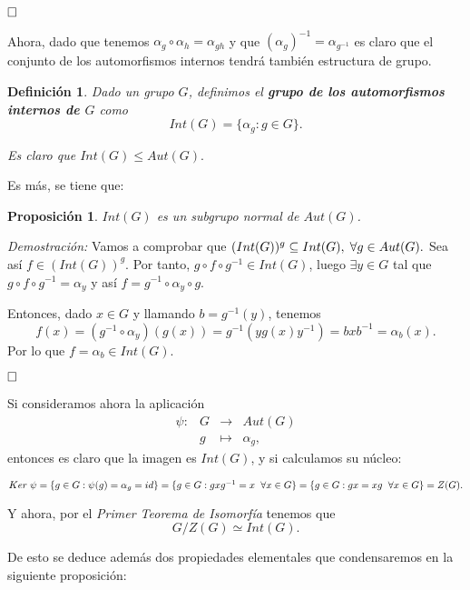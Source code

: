 \documentclass[12pt]{article}
\newtheorem{proposition}[theorem]{Proposición}
\newtheorem{definition}[theorem]{Definición}
\begin{document}
$\hfill \square$

Ahora, dado que tenemos $\alpha_{g} \circ \alpha_{h} = \alpha_{gh}$ y que $(\alpha_{g})^{-1} = \alpha_{g^{-1}}$ es claro que el conjunto de los automorfismos internos tendrá también estructura de grupo.

\begin{definition} Dado un grupo $G$, definimos el \textbf{grupo de los automorfismos internos de $G$} como 
$$Int (G) = \lbrace\alpha_{g} : g \in G \rbrace.$$

Es claro que $Int (G) \leq Aut(G).$
\end{definition}

Es más, se tiene que: 

\begin{proposition}$Int(G)$ es un subgrupo normal de $Aut(G)$.
\end{proposition}
\emph{Demostración: }Vamos a comprobar que $(Int (G))^{g} \subseteq Int(G), \hspace{0.1cm} \forall g \in Aut(G).$ Sea así $f \in (Int(G))^{g}$. Por tanto, $g \circ f \circ g^{-1} \in Int(G)$, luego $\exists y \in G$ tal que $g \circ f \circ g^{-1} = \alpha_{y}$ y así $f= g^{-1} \circ \alpha_{y} \circ g.$

Entonces, dado $x \in G$ y llamando $b = g^{-1}(y)$, tenemos $$f(x) = (g^{-1} \circ \alpha_{y})(g(x)) = g^{-1}(yg(x)y^{-1}) = bxb^{-1} = \alpha_{b}(x).$$ Por lo que $f = \alpha_{b} \in Int(G)$.

$\hfill \square$

Si consideramos ahora la aplicación $$\begin{array}{rccl}
\psi\colon &G& \longrightarrow &Aut(G)\\
&g& \longmapsto &\alpha_{g},
\end{array}
$$
entonces es claro que la imagen es $Int(G)$, y si calculamos su núcleo: \begin{center}
$Ker\hspace{0.1cm} \psi = \lbrace g \in G: \psi(g) = \alpha_{g} = id \rbrace = \lbrace g \in G : gxg^{-1} = x \hspace{0.2cm} \forall x \in G \rbrace = \lbrace g \in G : gx = xg\hspace{0.2cm} \forall x \in G \rbrace = Z(G).$
\end{center}

Y ahora, por el \textit{Primer Teorema de Isomorfía} tenemos que $$G/Z(G) \simeq Int(G).$$

De esto se deduce además dos propiedades elementales que condensaremos en la siguiente proposición:
\end{document}
